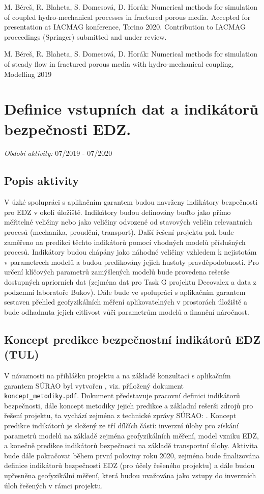 \documentclass[11pt,a4paper]{article}
\begin{document}
\begin{onehalfspacing}
\vspace{2ex}


M. Béreš, R. Blaheta, S. Domesová, D. Horák: Numerical methods for simulation of coupled hydro-mechanical processes in fractured porous media. Accepted for presentation at IACMAG konference, Torino 2020. Contribution to IACMAG proceedings (Springer) submitted and under review.

M. Béreš, R. Blaheta, S. Domesová, D. Horák: Numerical methods for simulation of steady flow in fractured porous media with hydro-mechanical coupling, Modelling 2019

\section{Definice vstupních dat a indikátorů bezpečnosti EDZ.}
{\it Období aktivity:}  07/2019 - 07/2020
 
\subsection{Popis aktivity} 
V úzké spolupráci s aplikačním garantem budou navrženy indikátory bezpečnosti pro EDZ v okolí úložiště. Indikátory budou
definovány buďto jako přímo měřitelné veličiny nebo jako veličiny odvozené od stavových veličin relevantních procesů (mechanika,
proudění, transport). Další řešení projektu pak bude zaměřeno na predikci těchto indikátorů pomocí vhodných modelů příslušných
procesů. Indikátory budou chápány jako náhodné veličiny
vzhledem k nejistotám v parametrech modelů a budou predikovány jejich hustoty pravděpodobnosti. Pro určení klíčových parametrů
zamýšlených modelů bude provedena rešerše dostupných apriorních dat (zejména dat pro Task G projektu Decovalex a data z
podzemní laboratoře Bukov). Dále bude ve spolupráci s aplikačním garantem sestaven přehled geofyzikálních měření aplikovatelných
v prostorách úložiště a bude odhadnuta jejich citlivost vůči parametrům modelů a finanční náročnost.


\subsection{Koncept predikce bezpečnostní indikátorů EDZ (TUL)}

V návaznosti na přihlášku projektu a na základě konzultací s aplikačním garantem SÚRAO byl vytvořen , viz. příložený dokument {\tt koncept\_metodiky.pdf}. Dokument představuje pracovní definici indikátorů bezpečnosti, dále koncept metodiky jejich predikce a základní rešerši zdrojů pro řešení projektu, ta vychází zejména z technické zprávy SÚRAO: 
\cite{SURAO_50/2016}. Koncept predikce indikátorů je složený ze tří dílčích částí: inverzní úlohy pro získání parametrů modelů na základě zejména geofyzikálních měření, model vzniku EDZ, a konečně predikce indikátorů bezpečnosti na základě transportní úlohy.    Aktivita bude dále pokračovat během první poloviny roku 2020, zejména bude finalizována definice indikátorů bezpečnosti EDZ (pro účely řešeného projektu) a dále budou upřesněna geofyzikální měření, která budou uvažována jako vstupy do inverzních úloh řešených v rámci projektu.


\end{onehalfspacing}
\end{document}
